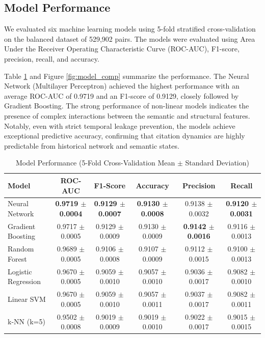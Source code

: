 \documentclass[11pt,a4paper]{article}
\begin{document}
\subsection{Model Performance}
We evaluated six machine learning models using 5-fold stratified cross-validation on the balanced dataset of 529,902 pairs. The models were evaluated using Area Under the Receiver Operating Characteristic Curve (ROC-AUC), F1-score, precision, recall, and accuracy. 

Table \ref{tab:results} and Figure \ref{fig:model_comp} summarize the performance. The Neural Network (Multilayer Perceptron) achieved the highest performance with an average ROC-AUC of 0.9719 and an F1-score of 0.9129, closely followed by Gradient Boosting. The strong performance of non-linear models indicates the presence of complex interactions between the semantic and structural features. Notably, even with strict temporal leakage prevention, the models achieve exceptional predictive accuracy, confirming that citation dynamics are highly predictable from historical network and semantic states.

\begin{table}[htbp]
\centering
\caption{Model Performance (5-Fold Cross-Validation Mean $\pm$ Standard Deviation)}
\label{tab:results}
\begin{tabular}{lccccc}
\toprule
\textbf{Model} & \textbf{ROC-AUC} & \textbf{F1-Score} & \textbf{Accuracy} & \textbf{Precision} & \textbf{Recall} \\
\midrule
Neural Network & \textbf{0.9719 $\pm$ 0.0004} & \textbf{0.9129 $\pm$ 0.0007} & \textbf{0.9130 $\pm$ 0.0008} & 0.9138 $\pm$ 0.0032 & \textbf{0.9120 $\pm$ 0.0031} \\
Gradient Boosting & 0.9717 $\pm$ 0.0005 & 0.9129 $\pm$ 0.0009 & 0.9130 $\pm$ 0.0009 & \textbf{0.9142 $\pm$ 0.0016} & 0.9116 $\pm$ 0.0013 \\
Random Forest & 0.9689 $\pm$ 0.0005 & 0.9106 $\pm$ 0.0008 & 0.9107 $\pm$ 0.0009 & 0.9112 $\pm$ 0.0015 & 0.9100 $\pm$ 0.0013 \\
Logistic Regression & 0.9670 $\pm$ 0.0005 & 0.9059 $\pm$ 0.0010 & 0.9057 $\pm$ 0.0010 & 0.9036 $\pm$ 0.0017 & 0.9082 $\pm$ 0.0010 \\
Linear SVM & 0.9670 $\pm$ 0.0005 & 0.9059 $\pm$ 0.0010 & 0.9057 $\pm$ 0.0011 & 0.9037 $\pm$ 0.0017 & 0.9082 $\pm$ 0.0011 \\
k-NN (k=5) & 0.9502 $\pm$ 0.0008 & 0.9019 $\pm$ 0.0009 & 0.9019 $\pm$ 0.0010 & 0.9022 $\pm$ 0.0017 & 0.9015 $\pm$ 0.0015 \\
\bottomrule
\end{tabular}
\end{table}
\end{document}
